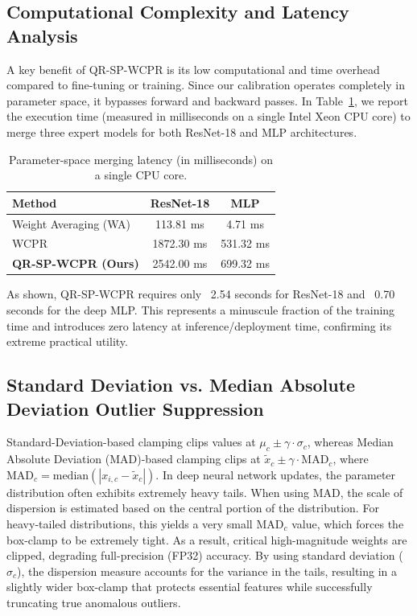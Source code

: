\documentclass{article}
\theoremstyle{plain}
\theoremstyle{definition}
\theoremstyle{remark}
\begin{document}
\subsection{Computational Complexity and Latency Analysis}
A key benefit of QR-SP-WCPR is its low computational and time overhead compared to fine-tuning or training. Since our calibration operates completely in parameter space, it bypasses forward and backward passes.
In Table~\ref{tab:latency}, we report the execution time (measured in milliseconds on a single Intel Xeon CPU core) to merge three expert models for both ResNet-18 and MLP architectures.

\begin{table}[h]
\centering
\caption{Parameter-space merging latency (in milliseconds) on a single CPU core.}
\label{tab:latency}
\begin{tabular}{lcc}
\toprule
Method & ResNet-18 & MLP \\
\midrule
Weight Averaging (WA) & 113.81 ms & 4.71 ms \\
WCPR & 1872.30 ms & 531.32 ms \\
\textbf{QR-SP-WCPR (Ours)} & 2542.00 ms & 699.32 ms \\
\bottomrule
\end{tabular}
\end{table}

As shown, QR-SP-WCPR requires only ~2.54 seconds for ResNet-18 and ~0.70 seconds for the deep MLP. This represents a minuscule fraction of the training time and introduces zero latency at inference/deployment time, confirming its extreme practical utility.

\subsection{Standard Deviation vs. Median Absolute Deviation Outlier Suppression}
Standard-Deviation-based clamping clips values at $\mu_c \pm \gamma \cdot \sigma_c$, whereas Median Absolute Deviation (MAD)-based clamping clips at $\tilde{x}_c \pm \gamma \cdot \text{MAD}_c$, where $\text{MAD}_c = \text{median}(|x_{i,c} - \tilde{x}_c|)$. 
In deep neural network updates, the parameter distribution often exhibits extremely heavy tails. When using MAD, the scale of dispersion is estimated based on the central portion of the distribution. For heavy-tailed distributions, this yields a very small $\text{MAD}_c$ value, which forces the box-clamp to be extremely tight. As a result, critical high-magnitude weights are clipped, degrading full-precision (FP32) accuracy. By using standard deviation ($\sigma_c$), the dispersion measure accounts for the variance in the tails, resulting in a slightly wider box-clamp that protects essential features while successfully truncating true anomalous outliers.
\end{document}
